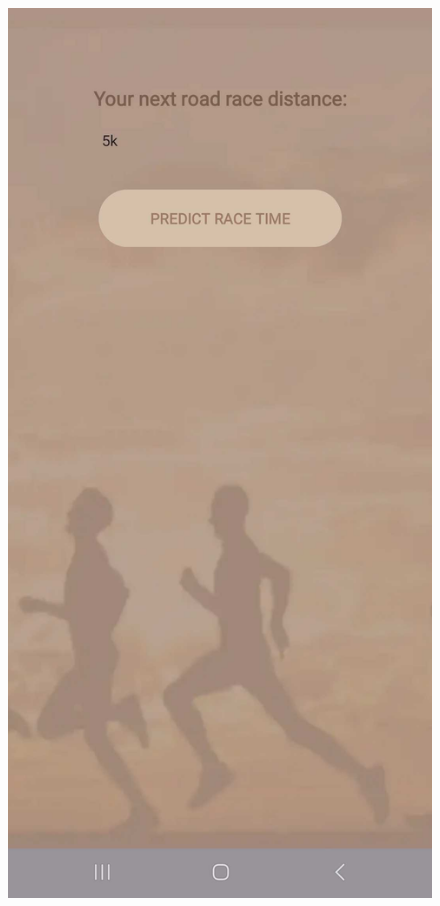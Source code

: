 \documentclass[12pt,oneside]{memoir}
\begin{document}
\begin{figure}[H]
  \centering
  \begin{minipage}{0.27\textwidth}
    \centering
    \includegraphics[width=\textwidth]{assets/pictures/app_screenshots/race_prediction_0.jpg}

\end{minipage}
\end{figure}
\end{document}
